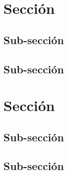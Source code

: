 \section{Sección}

\subsection{Sub-sección}

\subsection{Sub-sección}

\section{Sección}

\subsection{Sub-sección}

\subsection{Sub-sección}

